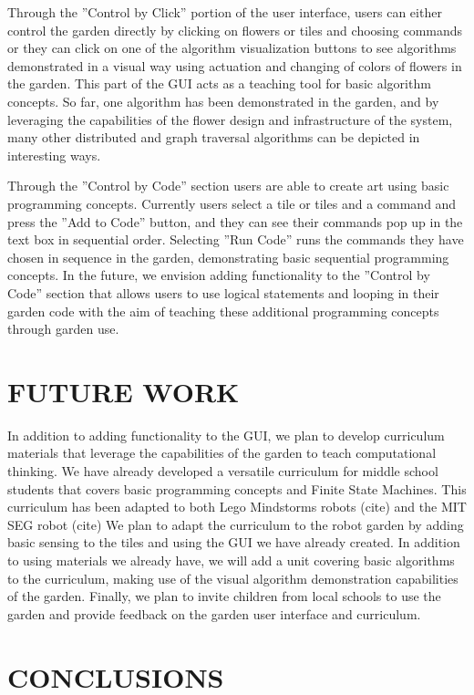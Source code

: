 \documentclass[letterpaper, 10 pt, conference]{ieeeconf}  %
\begin{document}
Through the ''Control by Click'' portion of the user interface, users can either control the garden directly by clicking on flowers or tiles and choosing commands or they can click on one of the algorithm visualization buttons to see algorithms demonstrated in a visual way using actuation and changing of colors of flowers in the garden.  This part of the GUI acts as a teaching tool for basic algorithm concepts.  So far, one algorithm has been demonstrated in the garden, and by leveraging the capabilities of the flower design and infrastructure of the system, many other distributed and graph traversal algorithms can be depicted in interesting ways.  

Through the ''Control by Code'' section users are able to create art using basic programming concepts.  Currently users select a tile or tiles and a command and press the ''Add to Code'' button, and they can see their commands pop up in the text box in sequential order.  Selecting ''Run Code'' runs the commands they have chosen in sequence in the garden, demonstrating basic sequential programming concepts.  In the future, we envision adding functionality to the ''Control by Code'' section that allows users to use logical statements and looping in their garden code with the aim of teaching these additional programming concepts through garden use.

\section{FUTURE WORK}
In addition to adding functionality to the GUI, we plan to develop curriculum materials that leverage the capabilities of the garden to teach computational thinking.  We have already developed a versatile curriculum for middle school students that covers basic programming concepts and Finite State Machines.  This curriculum has been adapted to both Lego Mindstorms robots (cite) and the MIT SEG robot (cite) We plan to adapt the curriculum to the robot garden by adding basic sensing to the tiles and using the GUI we have already created.  In addition to using materials we already have, we will add a unit covering basic algorithms to the curriculum, making use of the visual algorithm demonstration capabilities of the garden.  Finally, we plan to invite children from local schools to use the garden and provide feedback on the garden user interface and curriculum.

\section{CONCLUSIONS}
\end{document}
